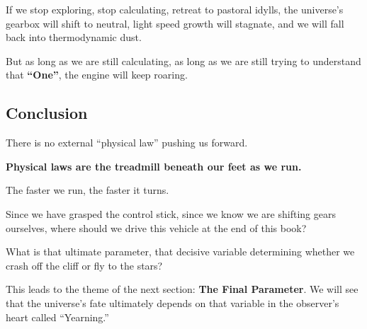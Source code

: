 If we stop exploring, stop calculating, retreat to pastoral idylls, the universe's gearbox will shift to neutral, light speed growth will stagnate, and we will fall back into thermodynamic dust.

But as long as we are still calculating, as long as we are still trying to understand that \textbf{``One''}, the engine will keep roaring.

\subsection{Conclusion}

There is no external ``physical law'' pushing us forward.

\textbf{Physical laws are the treadmill beneath our feet as we run.}

The faster we run, the faster it turns.

Since we have grasped the control stick, since we know we are shifting gears ourselves, where should we drive this vehicle at the end of this book?

What is that ultimate parameter, that decisive variable determining whether we crash off the cliff or fly to the stars?

This leads to the theme of the next section: \textbf{The Final Parameter}. We will see that the universe's fate ultimately depends on that variable in the observer's heart called ``Yearning.''

